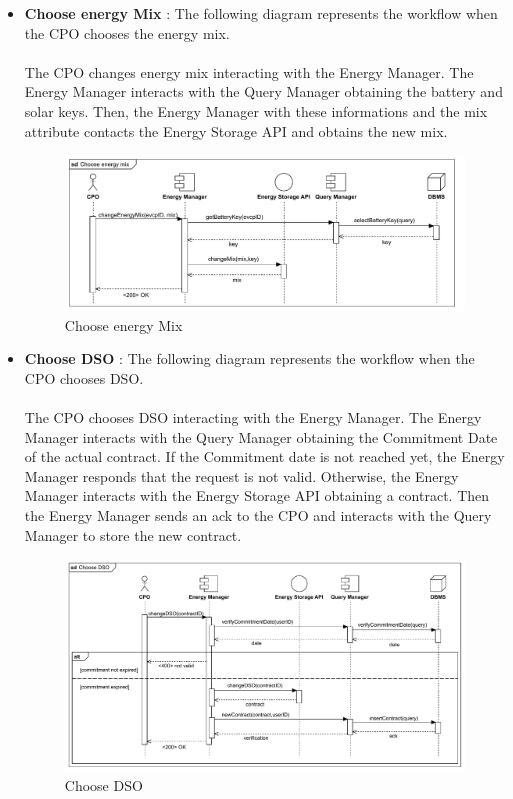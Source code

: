 \begin{itemize}
    \item \textbf{Choose energy Mix} : The following diagram represents the workflow when the CPO chooses the energy mix.\\
          \\ The CPO changes energy mix interacting with the Energy Manager. The Energy Manager interacts with the Query Manager obtaining the battery and solar keys.
          Then, the Energy Manager with these informations and the mix attribute contacts the Energy Storage API and obtains the new mix.
          \begin{figure}[H]
              \centering
              \includegraphics[scale=0.55]{src/runtimeView/CPMS_energyMix.pdf}
              \caption{Choose energy Mix}
          \end{figure}
    \item \textbf{Choose DSO} : The following diagram represents the workflow when the CPO chooses DSO.\\
          \\ The CPO chooses DSO interacting with the Energy Manager. The Energy Manager interacts with the Query Manager obtaining the Commitment Date of the actual contract.
          If the Commitment date is not reached yet, the Energy Manager responds that the request is not valid.
          Otherwise, the Energy Manager interacts with the Energy Storage API obtaining a contract. Then the Energy Manager sends an ack to the CPO and interacts with the
          Query Manager to store the new contract.
          \begin{figure}[H]
              \centering
              \includegraphics[scale=0.55]{src/runtimeView/CPMS_chooseDSO.pdf}
              \caption{Choose DSO}
          \end{figure}



\end{itemize}


